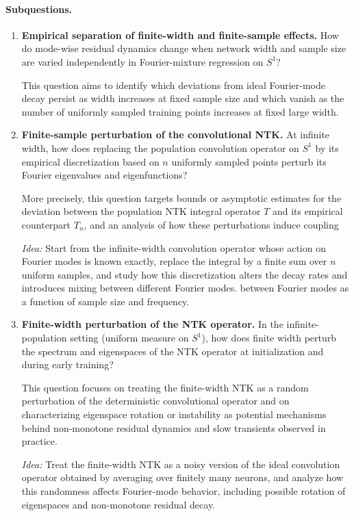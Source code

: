 \paragraph{Subquestions.}
\begin{enumerate}
	\item[(Q1)] \textbf{Empirical separation of finite-width and finite-sample effects.}
	      How do mode-wise residual dynamics change when network width and sample size are
	      varied independently in Fourier-mixture regression on $S^1$?

	      This question aims to identify which deviations from ideal Fourier-mode decay
	      persist as width increases at fixed sample size and which vanish as the number
	      of uniformly sampled training points increases at fixed large width.

	\item[(Q2)] \textbf{Finite-sample perturbation of the convolutional NTK.}
	      At infinite width, how does replacing the population convolution operator on
	      $S^1$ by its empirical discretization based on $n$ uniformly sampled points
	      perturb its Fourier eigenvalues and eigenfunctions?

	      More precisely, this question targets bounds or asymptotic estimates for the
	      deviation between the population NTK integral operator $T$ and its empirical
	      counterpart $T_n$, and an analysis of how these perturbations induce coupling

	      \emph{Idea:} Start from the infinite-width convolution operator whose action on
	      Fourier modes is known exactly, replace the integral by a finite sum over $n$
	      uniform samples, and study how this discretization alters the decay rates and
	      introduces mixing between different Fourier modes.      between Fourier modes as a function of sample size and frequency.

	\item[(Q3)] \textbf{Finite-width perturbation of the NTK operator.}
	      In the infinite-population setting (uniform measure on $S^1$), how does finite
	      width perturb the spectrum and eigenspaces of the NTK operator at initialization
	      and during early training?

	      This question focuses on treating the finite-width NTK as a random perturbation
	      of the deterministic convolutional operator and on characterizing eigenspace
	      rotation or instability as potential mechanisms behind non-monotone residual
	      dynamics and slow transients observed in practice.

	      \emph{Idea:} Treat the finite-width NTK as a noisy version of the ideal
	      convolution operator obtained by averaging over finitely many neurons, and
	      analyze how this randomness affects Fourier-mode behavior, including possible
	      rotation of eigenspaces and non-monotone residual decay.
\end{enumerate}


